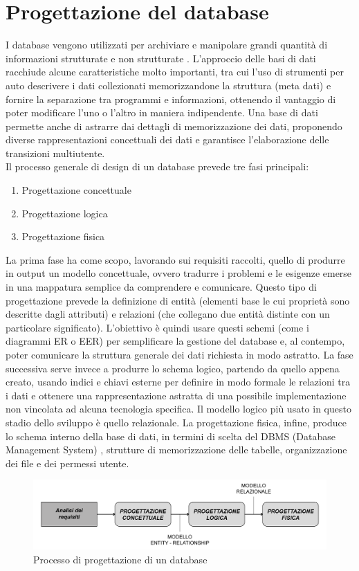 \chapter{Progettazione del database}
\label{cha:database}
I database vengono utilizzati per archiviare e manipolare grandi quantità di informazioni strutturate e non strutturate \cite{database}. L'approccio delle basi di dati racchiude alcune caratteristiche molto importanti, tra cui l'uso di strumenti per auto descrivere i dati collezionati memorizzandone la struttura (meta dati) e fornire la separazione tra programmi e informazioni, ottenendo il vantaggio di poter modificare l'uno o l'altro in maniera indipendente. Una base di dati permette anche di astrarre dai dettagli di memorizzazione dei dati, proponendo diverse rappresentazioni concettuali dei dati e garantisce l'elaborazione delle transizioni multiutente.\\
\newline
Il processo generale di design di un database prevede tre fasi principali:
\begin{enumerate}
    \item Progettazione concettuale
    \item Progettazione logica
    \item Progettazione fisica
\end{enumerate}
\noindent
La prima fase ha come scopo, lavorando sui requisiti raccolti, quello di produrre in output un modello concettuale, ovvero tradurre i problemi e le esigenze emerse in una mappatura semplice da comprendere e comunicare.
Questo tipo di progettazione prevede la definizione di entità (elementi base le cui proprietà sono descritte dagli attributi) e relazioni (che collegano due entità distinte con un particolare significato). L'obiettivo è quindi usare questi schemi (come i diagrammi ER o EER) per semplificare la gestione del database e, al contempo, poter comunicare la struttura generale dei dati richiesta in modo astratto.
La fase successiva serve invece a produrre lo schema logico, partendo da quello appena creato, usando indici e chiavi esterne per definire in modo formale le relazioni tra i dati e ottenere una rappresentazione astratta di una possibile implementazione non vincolata ad alcuna tecnologia specifica. Il modello logico più usato in questo stadio dello sviluppo è quello relazionale. La progettazione fisica, infine, produce lo schema interno della base di dati, in termini di scelta del DBMS (Database Management System) \cite{dbms}, strutture di memorizzazione delle tabelle, organizzazione dei file e dei permessi utente.
\begin{figure}[!hbt]
\centering
\includegraphics[scale=0.50]{img/desing_db.png}
\caption{Processo di progettazione di un database}
\label{fig:design_db}
\end{figure}
\noindent

